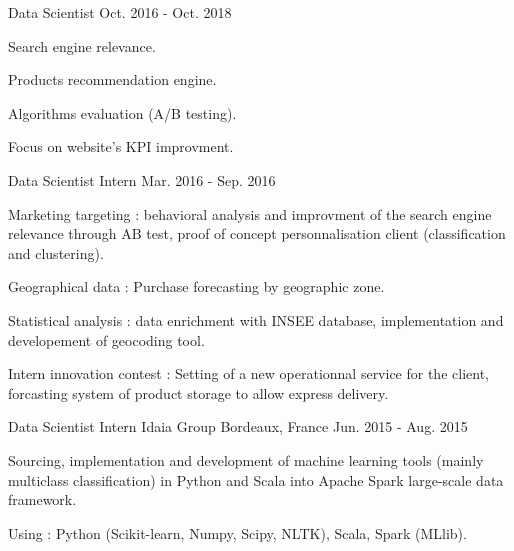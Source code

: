 \begin{cventries}
  \cventry
    {Data Scientist} %
    {} %
    {} %
    {Oct. 2016 - Oct. 2018} %
    {
      \begin{cvitems} %
        \item {Search engine relevance.}
        \item {Products recommendation engine.}
        \item {Algorithms evaluation (A/B testing).}
        \item {Focus on website's KPI improvment.}
      \end{cvitems}
    }

  \cventry
    {Data Scientist Intern} %
    {} %
    {} %
    {Mar. 2016 - Sep. 2016} %
    {
      \begin{cvitems} %
        \item {Marketing targeting : behavioral analysis and improvment of the search engine relevance through AB test, proof of concept personnalisation client (classification and clustering).}
        \item {Geographical data : Purchase forecasting by geographic zone.}
        \item {Statistical analysis : data enrichment with INSEE database, implementation and developement of geocoding tool.}
        \item {Intern innovation contest : Setting of a new operationnal service for the client, forcasting system of product storage to allow express delivery.}
      \end{cvitems}
    }

  \cventry
    {Data Scientist Intern} %
    {Idaia Group} %
    {Bordeaux, France} %
    {Jun. 2015 - Aug. 2015} %
    {
      \begin{cvitems} %
        \item {Sourcing, implementation and development of machine learning tools (mainly multiclass classification) in Python and Scala into Apache Spark large-scale data framework.}
      \end{cvitems}
      \vspace{9} 
      Using : Python (Scikit-learn, Numpy, Scipy, NLTK), Scala, Spark (MLlib).
    }
    
\end{cventries}
